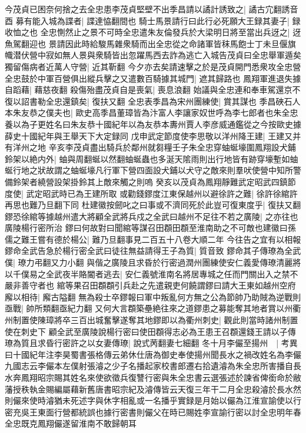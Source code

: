 今茂貞已困奈何捨之去全忠患李茂貞堅壁不出季昌請以譎計誘致之|{
	譎古宂翻誘音酉}
募有能入城為諜者|{
	諜達恊翻間也}
騎士馬景請行曰此行必死願大王録其妻子|{
	録收恤之也}
全忠惻然止之景不可時全忠遣朱友倫發兵於大梁明日將至當出兵迓之|{
	迓魚駕翻迎也}
景請因此時給駿馬雜衆騎而出全忠從之命諸軍皆秣馬飽士丁未旦偃旗幟潜伏營中寂如無人景與衆騎皆出忽躍馬西去詐為逃亡入城告茂貞曰全忠舉軍遁矣獨留傷病者近萬人守營|{
	近其靳翻}
今夕亦去矣請速擊之於是茂貞開門悉衆攻全忠營全忠鼓於中軍百營俱出縱兵擊之又遣數百騎據其城門|{
	遮其歸路也}
鳳翔軍進退失據自蹈藉|{
	藉慈夜翻}
殺傷殆盡茂貞自是喪氣|{
	喪息浪翻}
始議與全忠連和奉車駕還京不復以詔書勒全忠還鎮矣|{
	復扶又翻}
全忠表季昌為宋州團練使|{
	賞其謀也}
季昌硤石人本朱友恭之僕夫也|{
	歐史高季昌董璋皆為汴富人李讓家奴世呼為李七郎者也朱全忠養以為子更姓名曰朱友恭十國紀年以為友恭本夀州賈人李彦威通鑑從之今按歐史據薛史十國紀年與王舉天下大定録同}
戊申武定節度使李思敬以洋州降王建|{
	王建又并有洋州之地}
辛亥李茂貞盡出騎兵於鄰州就芻糧壬子朱全忠穿蚰蜒壕圍鳳翔設犬鋪鈴架以絶内外|{
	蚰與周翻蜒以然翻蚰蜒蟲也多涎天隂雨則出行地皆有跡穿壕塹如蚰蜒行地之狀故謂之蚰蜒壕凡行軍下營四面設犬鋪以犬守之敵來則羣吠使營中知所警備鈴架者繞營設架掛鈴其上敵來觸之則嗚}
癸亥以茂貞為鳳翔靜難武定昭武四鎮節度使|{
	武定昭武時已為王建所取}
或勸錢鏐度江東保越州以避徐許之難|{
	徐許徐綰許再思也難乃旦翻下同}
杜建徽按劒叱之曰事或不濟同死於此豈可復東度乎|{
	復扶又翻}
鏐恐徐綰等據越州遣大將顧全武將兵戍之全武曰越州不足往不若之廣陵|{
	之亦往也廣陵楊行密所治}
鏐曰何故對曰聞綰等謀召田頵田頵至淮南助之不可敵也建徽曰孫儒之難王嘗有德於楊公|{
	難乃旦翻事見二百五十八卷大順二年}
今往告之宜有以相報鏐命全武告急於楊行密全武曰徒往無益請得王子為質|{
	質音致}
鏐命其子傳璙為全武僕|{
	璙力弔翻又力小翻}
與偕之廣陵且求昏於行密過潤州團練使安仁義愛傳璙清麗將以千僕易之全武夜半賂閽者逃去|{
	安仁義號淮南名將居專城之任而門關出入之禁不嚴非善守者也}
綰等果召田頵頵引兵赴之先遣親吏何饒謂鏐曰請大王東如越州空府廨以相待|{
	廨古隘翻}
無為殺士卒鏐報曰軍中叛亂何方無之公為節帥乃助賊為逆戰則亟戰|{
	帥所類翻亟紀力翻}
又何大言頵築壘絶往來之道鏐患之募能奪其地者賞以州衢州制置使陳璋將卒三百出城奮擊遂奪其地鏐即以為衢州刺史|{
	觀此則當時諸州制置使在刺史下}
顧全武至廣陵說楊行密曰使田頵得志必為王患王召頵還錢王請以子傳璙為質且求昏行密許之以女妻傳璙|{
	說式苪翻妻七細翻}
冬十月李儼至揚州　|{
	考異曰十國紀年注李昊蜀書張格傳云弟休仕唐為御史奉使揚州聞長水之禍改姓名為李儼九國志云李儼本左僕射張濬之少子名播起家校書郎遷右拾遺濬為朱全忠所害播自長水奔鳳翔昭宗賜其姓名來使欲徵兵復讐行密與朱全忠書云選張述於諫省俾銜命於敝藩授秩執金賜編屬藉新舊唐書昭宗紀及濬傳皆云天復三年干二月全忠殺濬於長水然則儼來使時濬猶未死述字與休字相亂或一名播乎實録是月始以儼為江淮宣諭使以行密充吳王東面行營都統誤也據行密書則儼父在時已賜姓李宣諭行密以討全忠明年春全忠既克鳳翔儼遂留淮南不敢歸朝耳}
